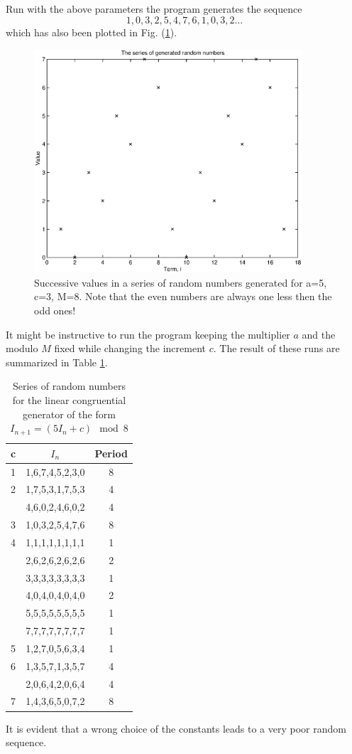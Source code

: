 Run with the above parameters the program generates the sequence
\begin{equation*}
1, 0, 3, 2, 5, 4, 7, 6, 1, 0, 3, 2 \ldots
\end{equation*}
which has also been plotted in Fig. (\ref{F_TRANDOM1}).
\begin{figure}
\label{F_TRANDOM1}
\includegraphics[width=10cm]{./Figures/f_trandom1.eps}
\caption{Successive values in a series of random numbers generated
for a=5, c=3, M=8. Note that the even numbers are always one less 
then the odd ones!}
\end{figure}
It might be instructive to run the program keeping the multiplier $a$ 
and the modulo $M$ fixed while changing the increment $c$. The result of 
these runs are summarized in Table \ref{T_LCG}.

\begin{table}
\label{T_LCG}
\caption{Series of random numbers for the linear congruential 
generator of the form $I_{n+1} = (5I_n +c) \mod 8$}
\begin{center}
\begin{tabular}{ccc} \hline\hline
c &  $I_n$ & Period  \\ \hline
1 & 1,6,7,4,5,2,3,0 & 8 \\
2 & 1,7,5,3,1,7,5,3 & 4 \\
  & 4,6,0,2,4,6,0,2 & 4 \\
3 & 1,0,3,2,5,4,7,6 & 8 \\
4 & 1,1,1,1,1,1,1,1 & 1 \\
  & 2,6,2,6,2,6,2,6 & 2 \\
  & 3,3,3,3,3,3,3,3 & 1 \\
  & 4,0,4,0,4,0,4,0 & 2 \\
  & 5,5,5,5,5,5,5,5 & 1 \\
  & 7,7,7,7,7,7,7,7 & 1 \\
5 & 1,2,7,0,5,6,3,4 & 1 \\
6 & 1,3,5,7,1,3,5,7 & 4 \\
  & 2,0,6,4,2,0,6,4 & 4 \\
7 & 1,4,3,6,5,0,7,2 & 8 \\ \hline \hline
\end{tabular}
\end{center}
\end{table}
It is evident that a wrong  choice of the constants leads to a 
very poor random sequence.

